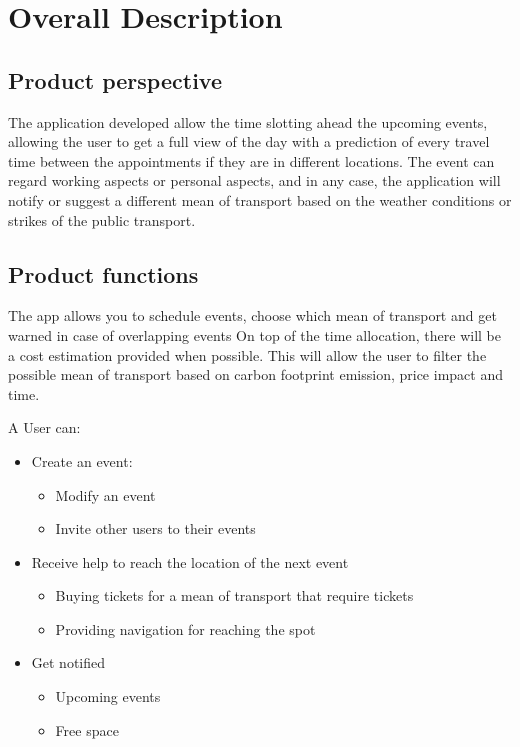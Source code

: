 \chapter{Overall Description}
\label{cha:desc}

\section{Product perspective}
\label{sec:productperspective}
The application developed allow the time slotting ahead the upcoming events, allowing the user to get a full view of the day with a prediction of every travel time between the appointments if they are in different locations.
The event can regard working aspects or personal aspects, and in any case, the application will notify or suggest a different mean of transport based on the weather conditions or strikes of the public transport.


\section{Product functions}
\label{sec:productfunctions}
The app allows you to schedule events, choose which mean of transport and get warned in case of overlapping events
On top of the time allocation, there will be a cost estimation provided when possible. 
This will allow the user to filter the possible mean of transport based on carbon footprint emission, price impact and time.

A User can:
\begin{itemize}
	\item Create an event:
	\begin{itemize}
		\item Modify an event
		\item Invite other users to their events
	\end{itemize}
	\item Receive help to reach the location of the next event
	\begin{itemize}
		\item Buying tickets for a mean of transport that require tickets
		\item Providing navigation for reaching the spot 
	\end{itemize}
\end{itemize}
\begin{itemize}
	\item Get notified
	\begin{itemize}
		\item Upcoming events
		\item Free space
	\end{itemize}
\end{itemize}

